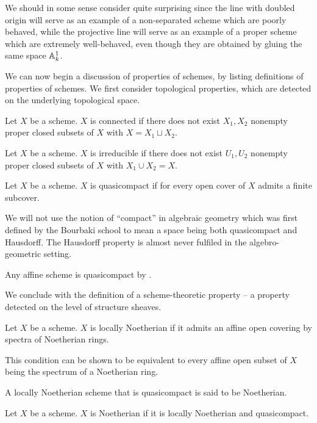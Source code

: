 \begin{remark}
    We should in some sense consider  quite surprising since the line with doubled origin will serve as an example of a non-separated scheme which are poorly behaved, while the projective line will serve as an example of a proper scheme which are extremely well-behaved, even though they are obtained by gluing the same space $\mathbb{A}^{1}_{k}$. 
\end{remark}
We can now begin a discussion of properties of schemes, by listing definitions of properties of schemes. We first consider topological properties, which are detected on the underlying topological space. 
\begin{definition}\label{def: connected scheme}
    Let $X$ be a scheme. $X$ is connected if there does not exist $X_{1},X_{2}$ nonempty proper closed subsets of $X$ with $X=X_{1}\sqcup X_{2}$. 
\end{definition}
\begin{definition}\label{def: irreducible}
    Let $X$ be a scheme. $X$ is irreducible if there does not exist $U_{1},U_{2}$ nonempty proper closed subsets of $X$ with $X_{1}\cup X_{2}=X$. 
\end{definition}
\begin{definition}\label{def: quasicompact}
    Let $X$ be a scheme. $X$ is quasicompact if for every open cover of $X$ admits a finite subcover. 
\end{definition}
\begin{remark}
    We will not use the notion of ``compact'' in algebraic geometry which was first defined by the Bourbaki school to mean a space being both quasicompact and Hausdorff. The Hausdorff property is almost never fulfiled in the algebro-geometric setting. 
\end{remark}
\begin{example}
    Any affine scheme is quasicompact by .
\end{example}
We conclude with the definition of a scheme-theoretic property -- a property detected on the level of structure sheaves. 
\begin{definition}\label{lem: locally Noetherian}
    Let $X$ be a scheme. $X$ is locally Noetherian if it admits an affine open covering by spectra of Noetherian rings. 
\end{definition}
\begin{remark}\label{rmk: locally Noetherian is Zariski local property}
    This condition can be shown to be equivalent to every affine open subset of $X$ being the spectrum of a Noetherian ring. 
\end{remark}
A locally Noetherian scheme that is quasicompact is said to be Noetherian. 
\begin{definition}\label{def: Noetherian}
    Let $X$ be a scheme. $X$ is Noetherian if it is locally Noetherian and quasicompact. 
\end{definition}